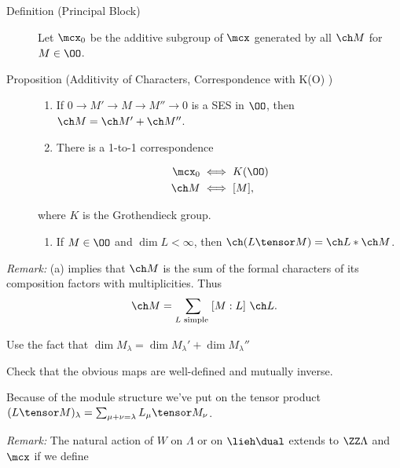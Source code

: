 \begin{description}
\item[Definition (Principal Block)]
Let \(\mcx_0\) be the additive subgroup of \(\mcx\) generated by all
\(\ch M\) for \(M \in \OO\).
\item[Proposition (Additivity of Characters, Correspondence with K(O) )]
\hfill

\begin{enumerate}
\def\labelenumi{\alph{enumi}.}
\item
  If \(0 \to M' \to M \to M'' \to 0\) is a SES in \(\OO\), then
  \(\ch M = \ch M' + \ch M''\).
\item
  There is a 1-to-1 correspondence
\end{enumerate}

\begin{align*}
\mcx_0 &\iff K(\OO) \\
\ch M &\iff [M]
,\end{align*}

where \(K\) is the Grothendieck group.

\begin{enumerate}
\def\labelenumi{\alph{enumi}.}
\setcounter{enumi}{2}
\tightlist
\item
  If \(M\in \OO\) and \(\dim L < \infty\), then
  \(\ch(L\tensor M) = \ch L \ast \ch M\).
\end{enumerate}
\end{description}

\emph{Remark:} (a) implies that \(\ch M\) is the sum of the formal
characters of its composition factors with multiplicities. Thus
\begin{align*}
\ch M = \sum_{L \text{ simple }} [M:L] ~\ch L
.\end{align*}

\begin{description}
\tightlist
\item[Proof (of a)]
Use the fact that
\(\dim M_\lambda = \dim M_\lambda' + \dim M_\lambda''\)
\item[Proof (of b)]
Check that the obvious maps are well-defined and mutually inverse.
\item[Proof (of c)]
Because of the module structure we've put on the tensor product
\((L \tensor M)_\lambda = \sum_{\mu + \nu = \lambda} L_\mu \tensor M_\nu\).
\end{description}

\emph{Remark:} The natural action of \(W\) on \(\Lambda\) or on
\(\lieh\dual\) extends to \(\ZZ \Lambda\) and \(\mcx\) if we define

